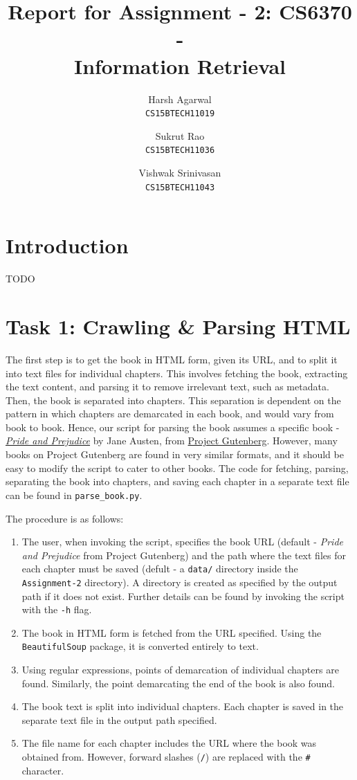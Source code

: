 \documentclass{article}
\title{Report for Assignment - 2: CS6370 - \\Information Retrieval}
\author{
Harsh Agarwal\\\texttt{CS15BTECH11019}
\and
Sukrut Rao\\\texttt{CS15BTECH11036}
\and
Vishwak Srinivasan\\\texttt{CS15BTECH11043}
}
\date{}
\begin{document}
\maketitle

\section{Introduction}
\begin{flushleft}
    TODO
\end{flushleft}

\section{Task 1: Crawling \& Parsing HTML}
\begin{flushleft}
The first step is to get the book in HTML form, given its URL, and to split it into text files for individual chapters. This involves fetching the book, extracting the text content, and parsing it to remove irrelevant text, such as metadata. Then, the book is separated into chapters. This separation is dependent on the pattern in which chapters are demarcated in each book, and would vary from book to book. Hence, our script for parsing the book assumes a specific book - \textit{\href{https://www.gutenberg.org/files/1342/1342-h/1342-h.htm}{Pride and Prejudice}} by Jane Austen, from \href{https://www.gutenberg.org}{Project Gutenberg}. However, many books on Project Gutenberg are found in very similar formats, and it should be easy to modify the script to cater to other books. The code for fetching, parsing, separating the book into chapters, and saving each chapter in a separate text file can be found in \verb|parse_book.py|.

The procedure is as follows:
\begin{enumerate}
	\item The user, when invoking the script, specifies the book URL (default - \textit{Pride and Prejudice} from Project Gutenberg) and the path where the text files for each chapter must be saved (defult - a \verb|data/| directory inside the \verb|Assignment-2| directory). A directory is created as specified by the output path if it does not exist. Further details can be found by invoking the script with the \verb|-h| flag.
	\item The book in HTML form is fetched from the URL specified. Using the \verb|BeautifulSoup| package, it is converted entirely to text.
	\item Using regular expressions, points of demarcation of individual chapters are found. Similarly, the point demarcating the end of the book is also found.
	\item The book text is split into individual chapters. Each chapter is saved in the separate text file in the output path specified.
	\item The file name for each chapter includes the URL where the book was obtained from. However, forward slashes (\verb|/|) are replaced with the \verb|#| character.
\end{enumerate}


\end{flushleft}
\end{document}
